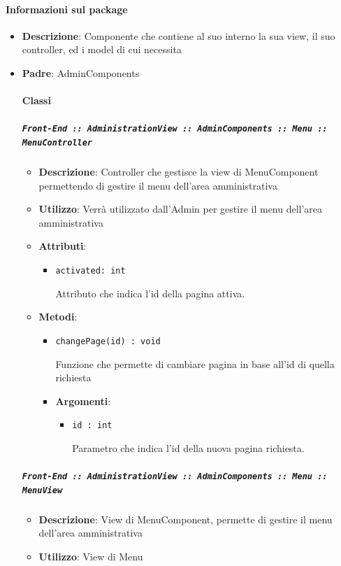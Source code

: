 \documentclass[../DefinizioneDiProdotto.tex]{subfiles}
\begin{document}
	\paragraph{Informazioni sul package}\begin{itemize}\item \textbf{Descrizione}: Componente che contiene al suo interno la sua view, il suo controller, ed i model di cui necessita\item \textbf{Padre}: AdminComponents\paragraph{Classi}
	\subparagraph{\texttt{Front-End :: AdministrationView :: AdminComponents :: Menu :: MenuController}}
	\begin{itemize}\item \textbf{Descrizione}: Controller che gestisce la view di MenuComponent permettendo di gestire il menu dell'area amministrativa
	\item \textbf{Utilizzo}: Verrà utilizzato dall'Admin per gestire il menu dell'area amministrativa
	\item \textbf{Attributi}:
	\begin{itemize}
	\item \texttt{activated: int}\

	 Attributo che indica l'id della pagina attiva.
	\end{itemize}
	\item \textbf{Metodi}:
	\begin{itemize}
	\item \texttt{changePage(id) : void}\

	 Funzione che permette di cambiare pagina in base all'id di quella richiesta

	\item \textbf{Argomenti}:
	\begin{itemize}
	\item \texttt{id : int}\

	 Parametro che indica l'id della nuova pagina richiesta.
	\end{itemize}
	\end{itemize}\vspace{0.5em}
	\end{itemize}\subparagraph{\texttt{Front-End :: AdministrationView :: AdminComponents :: Menu :: MenuView}}
	\begin{itemize}\item \textbf{Descrizione}: View di MenuComponent, permette di gestire il menu dell'area amministrativa
	\item \textbf{Utilizzo}: View di Menu
	\end{itemize}\end{itemize}
\end{document}
